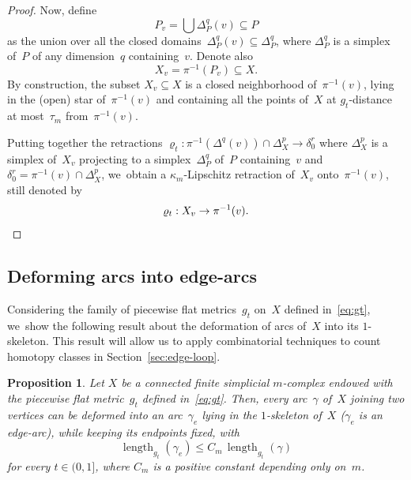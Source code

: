 \documentclass[JEP,XML,SOM,Unicode,NoFloatCountersInSection,published]{cedram}
\newtheorem{proposition}[theorem]{Proposition}
\theoremstyle{definition}
\DeclareMathOperator{\length}{length}
\begin{document}
\begin{proof}
Now, define
\begin{equation} \label{eq:Pv}
P_v = \bigcup \Delta_P^q(v) \subseteq P
\end{equation}
as the union over all the closed domains~$\Delta_P^q(v) \subseteq \Delta_P^q$, where $\Delta_P^q$ is a simplex of~$P$ of any dimension~$q$ containing~$v$.
Denote also
\begin{equation} \label{eq:Xv}
X_v = \pi^{-1}(P_v) \subseteq X.
\end{equation}
By construction, the subset $X_v \subseteq X$ is a closed neighborhood of~$\pi^{-1}(v)$, lying in the (open) star of~$\pi^{-1}(v)$ and containing all the points of~$X$ at $g_t$-distance at most~$\tau_m$ from~$\pi^{-1}(v)$.

Putting together the retractions $\varrho_t : \pi^{-1}(\Delta^q(v)) \cap \Delta_X^p \to \delta_0^r$ where $\Delta_X^p$ is a simplex of~$X_v$ projecting to a simplex~$\Delta_P^q$ of~$P$ containing~$v$ and $\delta_0^r= \pi^{-1}(v) \cap \Delta_X^p$, we~obtain a $\kappa_m$-Lipschitz retraction of~$X_v$ onto~$\pi^{-1}(v)$, still denoted by
\[
\varrho_t:X_v \to \pi^{-1}(v).\qedhere
\]
\end{proof}

\subsection{Deforming arcs into edge-arcs} \label{sec:deforming}

Considering the family of piecewise flat metrics~$g_t$ on~$X$ defined in~\eqref{eq:gt}, we~show the following result about the deformation of arcs of~$X$ into its $1$-skeleton.
This result will allow us to apply combinatorial techniques to count homotopy classes in Section~\ref{sec:edge-loop}.

\begin{proposition} \label{prop:deforming}
Let $X$ be a connected finite simplicial $m$\nobreakdash-complex endowed with the piecewise flat metric~$g_t$ defined in~\eqref{eq:gt}.
Then, every arc~$\gamma$ of~$X$ joining two vertices can be deformed into an arc~$\gamma_e$ lying in the $1$-skeleton of~$X$ (\ie $\gamma_e$ is an edge-arc), while keeping its endpoints fixed, with
\begin{equation} \label{eq:deforming}
\length_{g_t}(\gamma_e) \leq C_m \, \length_{g_t}(\gamma)
\end{equation}
for every $t \in (0,1]$, where $C_m$ is a positive constant depending only on~$m$.
\end{proposition}
\end{document}
